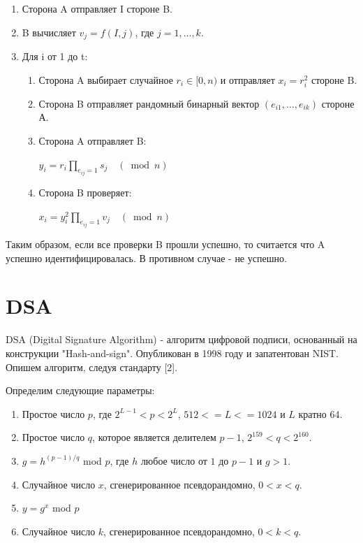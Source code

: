 \documentclass[colorthm]{./civarticle}
\begin{document}
\begin{enumerate}
    \item Сторона A отправляет I стороне B.
    \item B вычисляет $v_j = f(I, j)$, где $j=1,\ldots, k$.
    \item Для i от 1 до t:

        \begin{enumerate}
            \item Сторона A выбирает случайное $r_i \in [0, n)$ и отправляет $x_i=r^{2}_{i}$ стороне B.
            \item Сторона B отправляет рандомный бинарный вектор $(e_{i1}, \ldots, e_{ik})$ стороне А.
            \item Сторона A отправляет B:

            $y_i=r_i \prod_{e_{i j}=1} s_j \quad(\bmod n)$

            \item Сторона B проверяет:

            $x_i = y^{2}_{i} \prod_{e_{i j}=1} v_j \quad(\bmod n)$ 
        \end{enumerate}
    
\end{enumerate}

Таким образом, если все проверки B прошли успешно, то считается что A успешно идентифицировалась. В противном случае - не успешно.


\section{DSA}
DSA (Digital Signature Algorithm) - алгоритм цифровой подписи, основанный на конструкции "Hash-and-sign". Опубликован в 1998 году и запатентован NIST. Опишем алгоритм, следуя стандарту [2].

Определим следующие параметры:

\begin{enumerate}
    \item Простое число $p$, где $2^{L-1} < p < 2^{L}$, $512<=L<=1024$ и $L$ кратно 64.
    \item Простое число $q$, которое является делителем $p-1$, $2^{159} < q < 2^{160}$.
    \item $g=h^{(p-1)/q}$ mod $p$, где $h$ любое число от $1$ до $p-1$ и $g > 1$.
    \item Случайное число $x$, сгенерированное псевдорандомно, $0 < x < q$. 
    \item $y = g^x$ mod $p$
    \item Случайное число $k$, сгенерированное псевдорандомно, $0 < k < q$. 
\end{enumerate}
\end{document}

